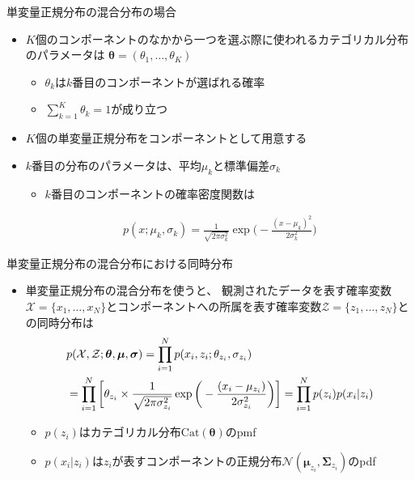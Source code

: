 \documentclass[aspectratio=169,unicode,dvipdfmx,14pt]{beamer}
\begin{document}
\begin{frame}{単変量正規分布の混合分布の場合}
\begin{itemize}
\item $K$個のコンポーネントのなかから一つを選ぶ際に使われるカテゴリカル分布のパラメータは
$\bm{\theta} = (\theta_1,\ldots,\theta_K)$
\begin{itemize}
\item $\theta_k$は$k$番目のコンポーネントが選ばれる確率
\item $\sum_{k=1}^K \theta_k = 1$が成り立つ
\end{itemize}
\item $K$個の単変量正規分布をコンポーネントとして用意する
\item $k$番目の分布のパラメータは、平均$\mu_k$と標準偏差$\sigma_k$
\begin{itemize}
\item $k$番目のコンポーネントの確率密度関数は
\end{itemize}
\begin{align}
p(x;\mu_k,\sigma_k) = \frac{1}{\sqrt{2\pi\sigma_k^2}}\exp\Big( - \frac{(x - \mu_k)^2}{2\sigma_k^2} \Big)
\end{align}
\end{itemize}
\end{frame}

\begin{frame}{単変量正規分布の混合分布における同時分布}
\begin{itemize}
\item 単変量正規分布の混合分布を使うと、
観測されたデータを表す確率変数$\mathcal{X} = \{x_1, \ldots, x_N\}$とコンポーネントへの所属を表す確率変数$\mathcal{Z} = \{z_1,\ldots,z_N\}$との同時分布は
\vspace{-.15in}
\begin{align}
& p( \mathcal{X}, \mathcal{Z} ;\bm{\theta},\bm{\mu},\bm{\sigma})
= \prod_{i=1}^N p(x_i, z_i ; \theta_{z_i}, \sigma_{z_i}) \notag \\ &
= \prod_{i=1}^N \bigg[ \theta_{z_i} \times \frac{1}{\sqrt{2\pi\sigma_{z_i}^2}}\exp\bigg( - \frac{(x_i - \mu_{z_i})}{2\sigma_{z_i}^2} \bigg) \bigg]
= \prod_{i=1}^N p(z_i) p(x_i | z_i)
\label{eq:joint_MN}
\end{align}
\vspace{-.4in}
\begin{itemize}
\item $p(z_i)$はカテゴリカル分布$\mbox{Cat}(\bm{\theta})$のpmf
\item $p(x_i | z_i)$は$z_i$が表すコンポーネントの正規分布$\mathcal{N}(\bm{\mu}_{z_i}, \bm{\Sigma}_{z_i})$のpdf
\end{itemize}
\end{itemize}
\end{frame}
\end{document}
